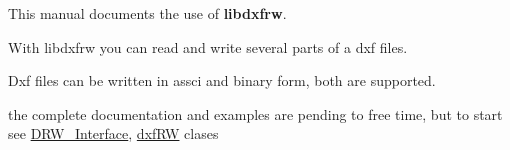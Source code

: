 This manual documents the use of {\bfseries{libdxfrw}}.

With libdxfrw you can read and write several parts of a dxf files.

Dxf files can be written in assci and binary form, both are supported.

the complete documentation and examples are pending to free time, but to start see \mbox{\hyperlink{class_d_r_w___interface}{DRW\+\_\+\+Interface}}, \mbox{\hyperlink{classdxf_r_w}{dxf\+RW}} clases 